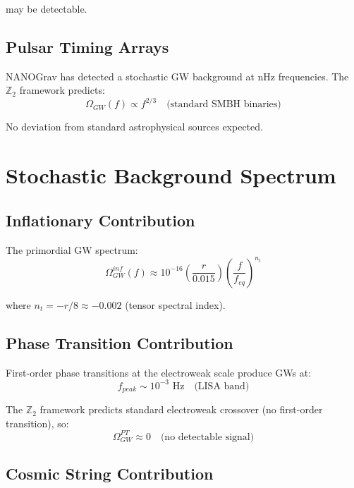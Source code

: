 \documentclass[12pt,a4paper]{article}
\begin{document}
may be detectable.

\subsection{Pulsar Timing Arrays}

NANOGrav has detected a stochastic GW background at nHz frequencies. The $\mathbb{Z}_2$ framework predicts:
\begin{equation}
\Omega_{GW}(f) \propto f^{2/3} \quad \text{(standard SMBH binaries)}
\end{equation}

No deviation from standard astrophysical sources expected.

\section{Stochastic Background Spectrum}

\subsection{Inflationary Contribution}

The primordial GW spectrum:
\begin{equation}
\Omega_{GW}^{inf}(f) \approx 10^{-16} \left(\frac{r}{0.015}\right) \left(\frac{f}{f_{eq}}\right)^{n_t}
\end{equation}

where $n_t = -r/8 \approx -0.002$ (tensor spectral index).

\subsection{Phase Transition Contribution}

First-order phase transitions at the electroweak scale produce GWs at:
\begin{equation}
f_{peak} \sim 10^{-3} \text{ Hz} \quad \text{(LISA band)}
\end{equation}

The $\mathbb{Z}_2$ framework predicts standard electroweak crossover (no first-order transition), so:
\begin{equation}
\Omega_{GW}^{PT} \approx 0 \quad \text{(no detectable signal)}
\end{equation}

\subsection{Cosmic String Contribution}
\end{document}
